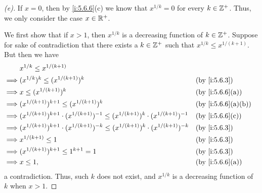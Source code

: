 \begin{proof}[(e)]
  If \(x = 0\), then by \cref{i:5.6.6}(c) we know that \(x^{1 / k} = 0\) for every \(k \in \mathbb{Z}^+\).
  Thus, we only consider the case \(x \in \mathbb{R}^+\).

  We first show that if \(x > 1\), then \(x^{1 / k}\) is a decreasing function of \(k \in \mathbb{Z}^+\).
  Suppose for sake of contradiction that there exists a \(k \in \mathbb{Z}^+\) such that \(x^{1 / k} \leq x^{1 / (k + 1)}\).
  But then we have
  \begin{align*}
             & x^{1 / k} \leq x^{1 / (k + 1)}                                                                                                      \\
    \implies & (x^{1 / k})^k \leq (x^{1 / (k + 1)})^k                                                                       &  & \by{i:5.6.3}      \\
    \implies & x \leq (x^{1 / (k + 1)})^k                                                                                   &  & \by{i:5.6.6}[a]   \\
    \implies & (x^{1 / (k + 1)})^{k + 1} \leq (x^{1 / (k + 1)})^k                                                           &  & \by{i:5.6.6}[a,b] \\
    \implies & (x^{1 / (k + 1)})^{k + 1} \cdot (x^{1 / (k + 1)})^{-1} \leq (x^{1 / (k + 1)})^k \cdot (x^{1 / (k + 1)})^{-1} &  & \by{i:5.6.6}[c]   \\
    \implies & (x^{1 / (k + 1)})^{k + 1} \cdot (x^{1 / (k + 1)})^{-k} \leq (x^{1 / (k + 1)})^k \cdot (x^{1 / (k + 1)})^{-k} &  & \by{i:5.6.3}      \\
    \implies & x^{1 / (k + 1)} \leq 1                                                                                       &  & \by{i:5.6.3}      \\
    \implies & (x^{1 / (k + 1)})^{k + 1} \leq 1^{k + 1} = 1                                                                 &  & \by{i:5.6.3}      \\
    \implies & x \leq 1,                                                                                                    &  & \by{i:5.6.6}[a]
  \end{align*}
  a contradiction.
  Thus, such \(k\) does not exist, and \(x^{1 / k}\) is a decreasing function of \(k\) when \(x > 1\).


\end{proof}

